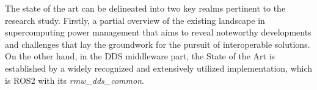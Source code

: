 

The state of the art can be delineated into two key realms pertinent to the research study. Firstly, a partial overview of the existing landscape in supercomputing power management that aims to reveal noteworthy developments and challenges that lay the groundwork for the pursuit of interoperable solutions. On the other hand, in the DDS middleware part, the State of the Art is established by a widely recognized and extensively utilized implementation, which is ROS2 with its \emph{rmw\_dds\_common}.%


